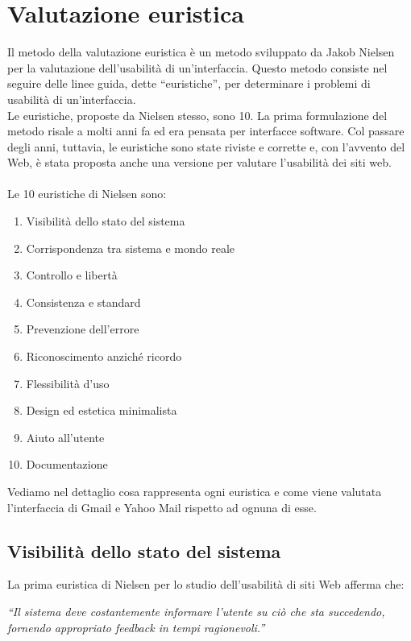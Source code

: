 \chapter{Valutazione euristica} \label{chap:valutazione_euristica}

	Il metodo della valutazione euristica è un metodo sviluppato da Jakob Nielsen per la valutazione dell'usabilità di un'interfaccia. Questo metodo consiste nel seguire delle linee guida, dette ``euristiche'', per determinare i problemi di usabilità di un'interfaccia.\\
	Le euristiche, proposte da Nielsen stesso, sono 10. La prima formulazione del metodo risale a molti anni fa ed era pensata per interfacce software. Col passare degli anni, tuttavia, le euristiche sono state riviste e corrette e, con l'avvento del Web, è stata proposta anche una versione per valutare l'usabilità dei siti web.\\
	\\
	Le 10 euristiche di Nielsen sono:
	\begin{enumerate}
		\item Visibilità dello stato del sistema
		\item Corrispondenza tra sistema e mondo reale
		\item Controllo e libertà
		\item Consistenza e standard
		\item Prevenzione dell'errore
		\item Riconoscimento anziché ricordo
		\item Flessibilità d'uso
		\item Design ed estetica minimalista
		\item Aiuto all'utente
		\item Documentazione
	\end{enumerate}
	
	Vediamo nel dettaglio cosa rappresenta ogni euristica e come viene valutata l'interfaccia di Gmail e Yahoo Mail rispetto ad ognuna di esse.
	
	\section{Visibilit\`{a} dello stato del sistema} \label{sec:visibilità_stato_sistema}
	
		La prima euristica di Nielsen per lo studio dell'usabilità di siti Web afferma che:
		\begin{center}
			\begin{minipage}{0.7\textwidth}
				\textit{``Il sistema deve costantemente informare l'utente su ciò che sta succedendo, fornendo appropriato feedback in tempi ragionevoli.''}
			\end{minipage}
		\end{center}
		
